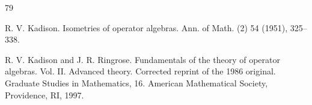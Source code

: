 \documentclass[leqno]{article} %
\numberwithin{equation}{section}
\begin{document}
\begin{thebibliography}{79}


R. V. Kadison.
\newblock Isometries of operator algebras. 
\newblock  Ann. of Math. (2) 54 (1951), 325--338. 



R. V. Kadison and J. R. Ringrose.
\newblock Fundamentals of the theory of operator algebras. Vol. II. Advanced theory. Corrected reprint of the 1986 original.
\newblock Graduate Studies in Mathematics, 16. American Mathematical Society, Providence, RI, 1997. 












\end{thebibliography}
\end{document}
